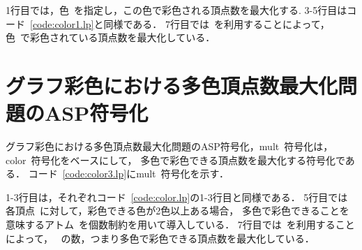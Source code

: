 1行目では，色~を指定し，この色で彩色される頂点数を最大化する.
3-5行目はコード~\ref{code:color1.lp}と同様である．
7行目では~を利用することによって，
色~で彩色されている頂点数を最大化している．


\section{グラフ彩色における多色頂点数最大化問題のASP符号化}



グラフ彩色における多色頂点数最大化問題のASP符号化，\textsf{mult}~符号化は，
\textsf{color}~符号化をベースにして，
多色で彩色できる頂点数を最大化する符号化である．
コード~\ref{code:color3.lp}に\textsf{mult}~符号化を示す．

1-3行目は，それぞれコード~\ref{code:color.lp}の1-3行目と同様である．
5行目では各頂点~に対して，彩色できる色が2色以上ある場合，
多色で彩色できることを意味するアトム~を個数制約を用いて導入している．
7行目では~を利用することによって，
~の数，つまり多色で彩色できる頂点数を最大化している．

